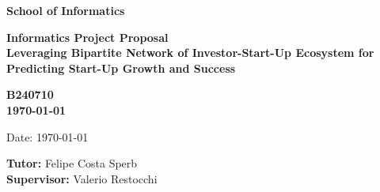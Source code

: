 \documentclass[a4paper,11pt]{article}
\newcommand{\examnumber}{B240710}
\newcommand{\field}{Leveraging Bipartite Network of Investor-Start-Up Ecosystem for Predicting Start-Up Growth and Success}
\newcommand{\tutor}{Felipe Costa Sperb}
\newcommand{\supervisor}{Valerio Restocchi}
\begin{document}
\begin{minipage}[b]{110mm}
        {\Huge\bf School of Informatics
        \vspace*{17mm}}
\end{minipage}
\hfill
\begin{minipage}[t]{40mm}               
\end{minipage}
\par\noindent
\vspace*{2cm}
\begin{center}
        \Large\bf Informatics Project Proposal \\
        \Large\bf \field
\end{center}
\vspace*{1.5cm}
\begin{center}
        \bf \examnumber\\
        \monthyeardate\today
\end{center}
\vspace*{5mm}

%
%                       
\begin{abstract}
This research proposes to utilize network science to analyze a bipartite network comprising investors and start-ups. By employing methodologies such as centrality analysis and community detection, we aim to map the intricate relationships between investors and start-ups and predict future growth trajectories and success rates. The nodes in this network will represent both investors and start-ups, while links will denote investment relationships. This will represent the investor-start-up dynamics that influence start-up outcomes. This will offer venture capital firms and entrepreneurs a strategic tool to make informed decisions and optimize their investment and growth strategies, fostering robust entrepreneurial ecosystems.
\end{abstract}

\vspace*{1cm}

\vspace*{3cm}
Date: \today

\vfill
{\bf Tutor:} \tutor\\
{\bf Supervisor:} \supervisor
\newpage

\setcounter{page}{1}                            %
\footruleheight{1pt}
\headruleheight{1pt}
\rhead{- \thepage}
\cfoot{}
%
\end{document}
